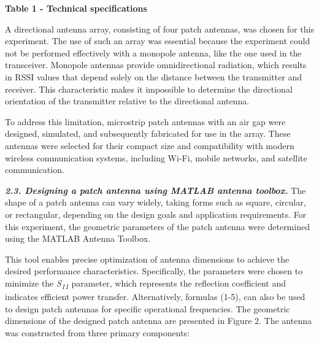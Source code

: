 {\bfseries Table 1 - Technical specifications}


A directional antenna array, consisting of four patch antennas, was
chosen for this experiment. The use of such an array was essential
because the experiment could not be performed effectively with a
monopole antenna, like the one used in the transceiver. Monopole
antennas provide omnidirectional radiation, which results in RSSI values
that depend solely on the distance between the transmitter and receiver.
This characteristic makes it impossible to determine the directional
orientation of the transmitter relative to the directional antenna.

To address this limitation, microstrip patch antennas with an air gap
were designed, simulated, and subsequently fabricated for use in the
array. These antennas were selected for their compact size and
compatibility with modern wireless communication systems, including
Wi-Fi, mobile networks, and satellite communication.

\emph{{\bfseries 2.3. Designing a patch antenna using MATLAB antenna
toolbox.}} The shape of a patch antenna can vary widely, taking forms
such as square, circular, or rectangular, depending on the design goals
and application requirements. For this experiment, the geometric
parameters of the patch antenna were determined using the MATLAB Antenna
Toolbox.

This tool enables precise optimization of antenna dimensions to achieve
the desired performance characteristics. Specifically, the parameters
were chosen to minimize the \emph{S\textsubscript{11 \hspace{0pt}}}
parameter, which represents the reflection coefficient and indicates
efficient power transfer. Alternatively, formulas (1-5), can also be
used to design patch antennas for specific operational frequencies. The
geometric dimensions of the designed patch antenna are presented in
Figure 2. The antenna was constructed from three primary components:



